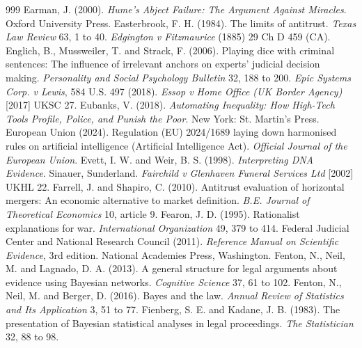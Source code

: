 \begin{thebibliography}{999}
 Earman, J. (2000). \emph{Hume's Abject Failure: The Argument Against Miracles}. Oxford University Press.
 Easterbrook, F. H. (1984). The limits of antitrust. \emph{Texas Law Review} 63, 1 to 40.
 \emph{Edgington v Fitzmaurice} (1885) 29 Ch D 459 (CA).
 Englich, B., Mussweiler, T. and Strack, F. (2006). Playing dice with criminal sentences: The influence of irrelevant anchors on experts' judicial decision making. \emph{Personality and Social Psychology Bulletin} 32, 188 to 200.
 \emph{Epic Systems Corp. v Lewis}, 584 U.S. 497 (2018).
 \emph{Essop v Home Office (UK Border Agency)} [2017] UKSC 27.
 Eubanks, V. (2018). \emph{Automating Inequality: How High-Tech Tools Profile, Police, and Punish the Poor}. New York: St. Martin's Press.
 European Union (2024). Regulation (EU) 2024/1689 laying down harmonised rules on artificial intelligence (Artificial Intelligence Act). \emph{Official Journal of the European Union}.
 Evett, I. W. and Weir, B. S. (1998). \emph{Interpreting DNA Evidence}. Sinauer, Sunderland.
 \emph{Fairchild v Glenhaven Funeral Services Ltd} [2002] UKHL 22.
 Farrell, J. and Shapiro, C. (2010). Antitrust evaluation of horizontal mergers: An economic alternative to market definition. \emph{B.E. Journal of Theoretical Economics} 10, article 9.
 Fearon, J. D. (1995). Rationalist explanations for war. \emph{International Organization} 49, 379 to 414.
 Federal Judicial Center and National Research Council (2011). \emph{Reference Manual on Scientific Evidence}, 3rd edition. National Academies Press, Washington.
 Fenton, N., Neil, M. and Lagnado, D. A. (2013). A general structure for legal arguments about evidence using Bayesian networks. \emph{Cognitive Science} 37, 61 to 102.
 Fenton, N., Neil, M. and Berger, D. (2016). Bayes and the law. \emph{Annual Review of Statistics and Its Application} 3, 51 to 77.
 Fienberg, S. E. and Kadane, J. B. (1983). The presentation of Bayesian statistical analyses in legal proceedings. \emph{The Statistician} 32, 88 to 98.

\end{thebibliography}
